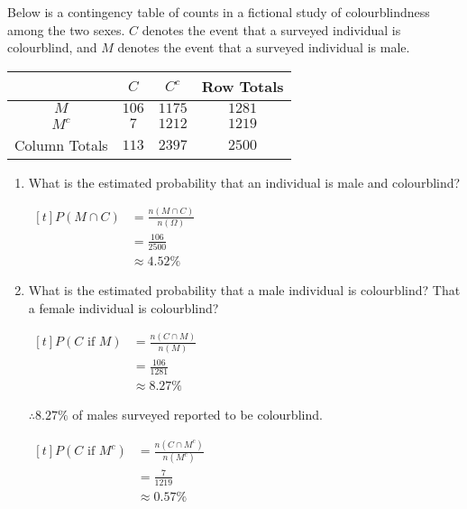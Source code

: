 \begin{example}
    Below is a contingency table of counts in a fictional study of colourblindness among the two sexes. $C$ denotes the event that a surveyed individual is colourblind, and $M$ denotes the event that a surveyed individual is male.

    \begin{center}
        \begin{tabular}{c | c c | c}
                          & $C$   & $C^c$  & Row Totals \\
            \hline
            $M$           & $106$ & $1175$ & $1281$     \\
            $M^c$         & $7$   & $1212$ & $1219$     \\
            \hline
            Column Totals & $113$ & $2397$ & $2500$
        \end{tabular}
    \end{center}

    \begin{enumerate}[label=\alph*)]
        \item What is the estimated probability that an individual is male and colourblind?

        $\begin{aligned}[t]
            P(M \cap C) & = \frac{n(M \cap C)}{n(\Omega)} \\
                        & = \frac{106}{2500}              \\
                        & \approx 4.52 \%
        \end{aligned}$

        \item What is the estimated probability that a male individual is colourblind? That a female individual is colourblind?

        \begin{minipage}[t]{0.45\linewidth}
            $\begin{aligned}[t]
                P(C \text{ if } M) & = \frac{n(C \cap M)}{n(M)} \\
                                   & = \frac{106}{1281}         \\
                                   & \approx 8.27 \%
            \end{aligned}$

            $\therefore 8.27\%$ of males surveyed reported to be colourblind. 
        \end{minipage}
        \hspace{0.025\linewidth}
        \begin{minipage}[t]{0.45\linewidth}
            $\begin{aligned}[t]
                P(C \text{ if } M^c) & = \frac{n(C \cap M^c)}{n(M^c)} \\
                                     & = \frac{7}{1219}               \\
                                     & \approx 0.57 \%
            \end{aligned}$


\end{minipage}
\end{enumerate}
\end{example}

